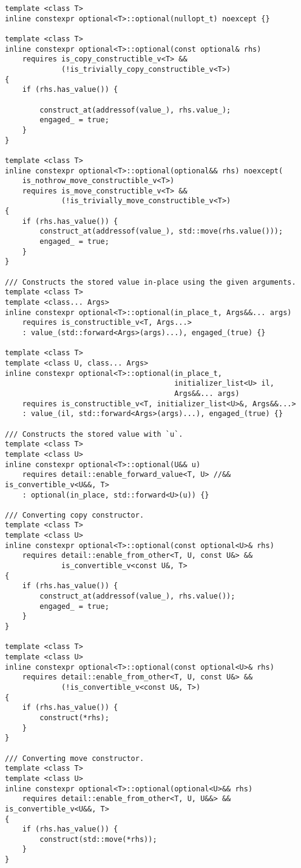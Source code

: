 \documentclass[a4paper,10pt,oneside,openany,final,article]{memoir}
\begin{document}
\begin{verbatim}
template <class T>
inline constexpr optional<T>::optional(nullopt_t) noexcept {}

template <class T>
inline constexpr optional<T>::optional(const optional& rhs)
    requires is_copy_constructible_v<T> &&
             (!is_trivially_copy_constructible_v<T>)
{
    if (rhs.has_value()) {

        construct_at(addressof(value_), rhs.value_);
        engaged_ = true;
    }
}

template <class T>
inline constexpr optional<T>::optional(optional&& rhs) noexcept(
    is_nothrow_move_constructible_v<T>)
    requires is_move_constructible_v<T> &&
             (!is_trivially_move_constructible_v<T>)
{
    if (rhs.has_value()) {
        construct_at(addressof(value_), std::move(rhs.value()));
        engaged_ = true;
    }
}

/// Constructs the stored value in-place using the given arguments.
template <class T>
template <class... Args>
inline constexpr optional<T>::optional(in_place_t, Args&&... args)
    requires is_constructible_v<T, Args...>
    : value_(std::forward<Args>(args)...), engaged_(true) {}

template <class T>
template <class U, class... Args>
inline constexpr optional<T>::optional(in_place_t,
                                       initializer_list<U> il,
                                       Args&&... args)
    requires is_constructible_v<T, initializer_list<U>&, Args&&...>
    : value_(il, std::forward<Args>(args)...), engaged_(true) {}

/// Constructs the stored value with `u`.
template <class T>
template <class U>
inline constexpr optional<T>::optional(U&& u)
    requires detail::enable_forward_value<T, U> //&& is_convertible_v<U&&, T>
    : optional(in_place, std::forward<U>(u)) {}

/// Converting copy constructor.
template <class T>
template <class U>
inline constexpr optional<T>::optional(const optional<U>& rhs)
    requires detail::enable_from_other<T, U, const U&> &&
             is_convertible_v<const U&, T>
{
    if (rhs.has_value()) {
        construct_at(addressof(value_), rhs.value());
        engaged_ = true;
    }
}

template <class T>
template <class U>
inline constexpr optional<T>::optional(const optional<U>& rhs)
    requires detail::enable_from_other<T, U, const U&> &&
             (!is_convertible_v<const U&, T>)
{
    if (rhs.has_value()) {
        construct(*rhs);
    }
}

/// Converting move constructor.
template <class T>
template <class U>
inline constexpr optional<T>::optional(optional<U>&& rhs)
    requires detail::enable_from_other<T, U, U&&> && is_convertible_v<U&&, T>
{
    if (rhs.has_value()) {
        construct(std::move(*rhs));
    }
}


\end{verbatim}
\end{document}
